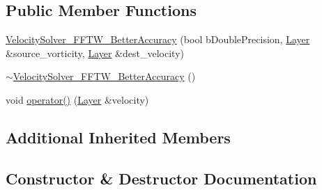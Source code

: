 \subsection*{Public Member Functions}
\begin{DoxyCompactItemize}
\item 
\hyperlink{class_velocity_solver___f_f_t_w___better_accuracy_a1a2a303a67ea83a7cb8010f546fdc13d}{Velocity\+Solver\+\_\+\+F\+F\+T\+W\+\_\+\+Better\+Accuracy} (bool b\+Double\+Precision, \hyperlink{struct_layer}{Layer} \&source\+\_\+vorticity, \hyperlink{struct_layer}{Layer} \&dest\+\_\+velocity)
\item 
\hyperlink{class_velocity_solver___f_f_t_w___better_accuracy_a11a3f4826557c95605548a8a1ff9c65e}{$\sim$\+Velocity\+Solver\+\_\+\+F\+F\+T\+W\+\_\+\+Better\+Accuracy} ()
\item 
void \hyperlink{class_velocity_solver___f_f_t_w___better_accuracy_a4ae34b500da178acfb0555c03e665041}{operator()} (\hyperlink{struct_layer}{Layer} \&velocity)
\end{DoxyCompactItemize}
\subsection*{Additional Inherited Members}


\subsection{Constructor \& Destructor Documentation}
\hypertarget{class_velocity_solver___f_f_t_w___better_accuracy_a1a2a303a67ea83a7cb8010f546fdc13d}{}
